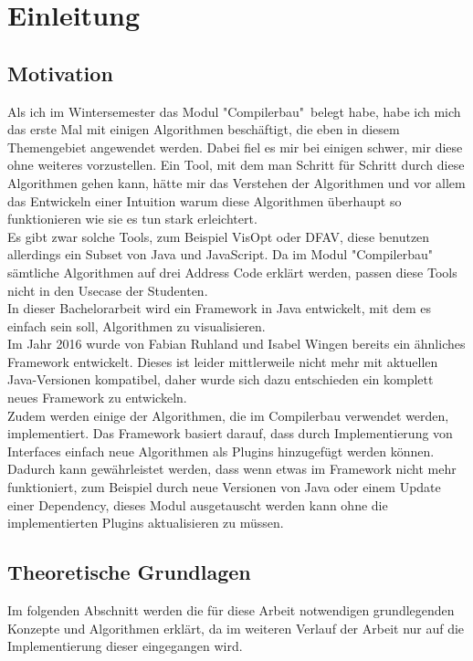 \section{Einleitung}
\subsection{Motivation} \label{motiv}
Als ich im Wintersemester das Modul "Compilerbau"\ 
belegt habe, habe ich mich das erste Mal mit
einigen Algorithmen beschäftigt, die eben in diesem
Themengebiet angewendet werden. Dabei fiel es mir
bei einigen schwer, mir diese ohne weiteres
vorzustellen. Ein Tool, mit dem man Schritt für Schritt 
durch diese Algorithmen gehen kann, hätte mir das Verstehen der Algorithmen
und vor allem das Entwickeln einer Intuition warum diese Algorithmen überhaupt
so funktionieren wie sie es tun stark erleichtert.\\

Es gibt zwar solche Tools, zum Beispiel VisOpt\cite{VisOpt} oder DFAV\cite{dfav},
diese benutzen allerdings ein Subset von Java und JavaScript.
Da im Modul "Compilerbau" sämtliche Algorithmen auf drei Address Code
erklärt werden, passen diese Tools nicht in den Usecase der Studenten.\\

In dieser Bachelorarbeit wird ein Framework in Java
entwickelt, mit dem es einfach sein soll,
Algorithmen zu visualisieren.\\

Im Jahr 2016 wurde von Fabian Ruhland und Isabel Wingen bereits ein ähnliches
Framework entwickelt\cite{toolbox}. Dieses ist leider mittlerweile nicht mehr
mit aktuellen Java-Versionen kompatibel, daher wurde sich dazu entschieden
ein komplett neues Framework zu entwickeln.\\

Zudem werden einige der Algorithmen, die im Compilerbau verwendet werden,
implementiert. Das Framework basiert darauf, dass durch
Implementierung von Interfaces einfach neue Algorithmen 
als Plugins hinzugefügt werden können. Dadurch kann gewährleistet werden,
dass wenn etwas im Framework nicht mehr funktioniert, 
zum Beispiel durch neue Versionen von Java oder einem Update einer Dependency, 
dieses Modul ausgetauscht werden kann ohne die implementierten Plugins 
aktualisieren zu müssen.


\newpage
\subsection{Theoretische Grundlagen}
Im folgenden Abschnitt werden die für diese Arbeit notwendigen 
grundlegenden Konzepte und Algorithmen erklärt, da im weiteren 
Verlauf der Arbeit nur auf die Implementierung dieser eingegangen wird.


